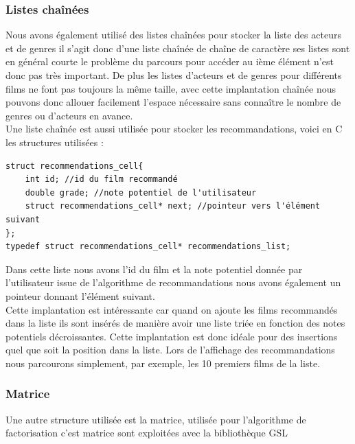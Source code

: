 \documentclass{article}
\begin{document}
\subsubsection{Listes chaînées}

Nous avons également utilisé des listes chaînées pour stocker la liste des acteurs et de genres il s’agit donc d’une liste chaînée de chaîne de caractère ses listes sont en général courte le problème du parcours pour accéder au ième élément n’est donc pas très important. De plus les listes d’acteurs et de genres pour différents films ne font pas toujours la même taille, avec cette implantation chaînée nous pouvons donc allouer facilement l’espace nécessaire sans connaître le nombre de genres ou d’acteurs en avance.\\
Une liste chaînée est aussi utilisée pour stocker les recommandations, voici en C les structures utilisées :


\begin{verbatim}
struct recommendations_cell{
    int id; //id du film recommandé
    double grade; //note potentiel de l'utilisateur
    struct recommendations_cell* next; //pointeur vers l'élément suivant
};
typedef struct recommendations_cell* recommendations_list;
\end{verbatim}

Dans cette liste nous avons l’id du film et la note potentiel donnée par l’utilisateur issue de l’algorithme de recommandations nous avons également un pointeur donnant l’élément suivant.\\
Cette implantation est intéressante car quand on ajoute les films recommandés dans la liste ils sont insérés de manière avoir une liste triée en fonction des notes potentiels décroissantes. Cette implantation est donc idéale pour des insertions quel que soit la position dans la liste. Lors de l’affichage des recommandations nous parcourons simplement, par exemple, les 10 premiers films de la liste.

\subsubsection{Matrice}
Une autre structure utilisée est la matrice, utilisée pour l’algorithme de factorisation c’est matrice sont exploitées avec la bibliothèque GSL
\end{document}
